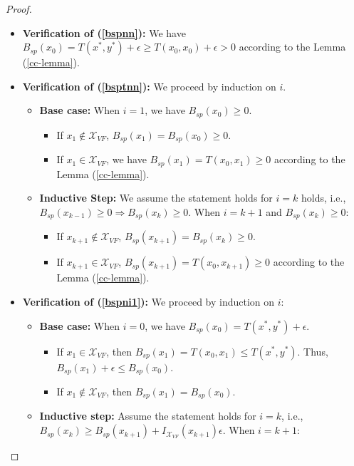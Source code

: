 \documentclass[acmlarge]{acmart}
\begin{document}
\begin{proof}
\begin{itemize}
    \item \textbf{Verification of (\ref{bspnn}):} We have \( B_{sp}(x_0) = T(x^*, y^*) + \epsilon \geq T(x_0, x_0) + \epsilon > 0 \) according to the Lemma (\ref{cc-lemma}).
    \item \textbf{Verification of (\ref{bsptnn}):} We proceed by induction on $i$.
    \begin{itemize}
      \item \textbf{Base case:} When $i=1$, we have $B_{sp}(x_0) \geq 0$. 
      \begin{itemize}
        \item If $x_1 \not \in \mathcal{X}_{VF}$, $B_{sp}(x_{1}) = B_{sp}(x_0) \geq 0$. 
        \item If $x_1 \in \mathcal{X}_{VF}$, we have $B_{sp}(x_1) = T(x_0, x_1) \geq 0$ according to the Lemma (\ref{cc-lemma}).
      \end{itemize}
      \item \textbf{Inductive Step:} We assume the statement holds for $i=k$ holds, i.e., $B_{sp}(x_{k-1}) \geq 0 \Rightarrow B_{sp}(x_k) \geq 0$. When $i = k+1$ and $B_{sp}(x_k) \geq 0$:
      \begin{itemize}
        \item If $x_{k+1} \not \in \mathcal{X}_{VF}$, $B_{sp}(x_{k+1}) = B_{sp}(x_k) \geq 0$.
        \item If $x_{k+1} \in \mathcal{X}_{VF}$, $B_{sp}(x_{k+1}) = T(x_0, x_{k+1}) \geq 0$ according to the Lemma (\ref{cc-lemma}).
      \end{itemize}
    \end{itemize}
    \item \textbf{Verification of (\ref{bspni1}):} We proceed by induction on \( i \):
    \begin{itemize}
        \item \textbf{Base case:} When $i=0$, we have \( B_{sp}(x_0) = T(x^*, y^*) + \epsilon \).
        \begin{itemize}
            \item If \( x_1 \in \mathcal{X}_{VF} \), then \( B_{sp}(x_1) = T(x_0, x_1) \leq T(x^*, y^*) \). Thus, \( B_{sp}(x_1) + \epsilon \leq B_{sp}(x_0) \).
            \item If \( x_1 \notin \mathcal{X}_{VF} \), then \( B_{sp}(x_1) = B_{sp}(x_0) \).
        \end{itemize}
        \item \textbf{Inductive step:} Assume the statement holds for \( i = k \), i.e., \( B_{sp}(x_k) \geq B_{sp}(x_{k+1}) + I_{\mathcal{X}_{VF}}(x_{k+1})\epsilon \). When $i=k+1$:

\end{itemize}
\end{itemize}
\end{proof}
\end{document}

